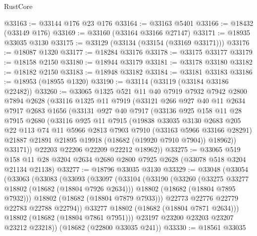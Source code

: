 \begin{lexlean}{RustCore}
\begin{coremodule}
@33163 := @33144 @176 @23 @176
@33164 := @33163 @5401
@33166 := @18432 (@33149 @176)
@33169 := @33160 (@33164 @33166 @27147)
@33171 := @18935 @33035 @3130
@33175 := @33129 (@33134 (@33154 (@33169 @33171)))
@33176 := @18087 @1320
@33177 := @18284 @33176
@33178 := @33175 @33177
@33179 := @18158 @2150
@33180 := @18944 @33179
@33181 := @33178 @33180
@33182 := @18182 @2150
@33183 := @18948 @33182
@33184 := @33181 @33183
@33186 := @18953 (@18955 @1320)
@33190 := @33114 (@33119 (@33184 @33186 @22482))
@33260 := @33065
    @1325
    @521
    @11
    @40
    @7919
    @7932
    @7942
    @2800
    @7894
    @2628
    (@33116
      @1325
      @11
      @7919
      (@33121
        @266
        @927
        @40
        @11
        @2634
        @7917
        @2683
        @1656
        (@33131
          @927
          @40
          @7917
          (@33136
            @925
            @158
            @11
            @28
            @7915
            @2680
            (@33116
              @925
              @11
              @7915
              (@19838
                @33035
                @3130
                @2683
                @205
                @22
                @113
                @74
                @11
                @5966
                @2813
                @7903
                @7910
                (@33163 @5966 @33166 @28291)
                @21887
                @21891
                @21895
                @19918
                (@18682 (@19920 @7910 @7904))
                @18962))
            @33171))
        @22203
        @22206
        @22209
        @22212
        @18962))
@33275 := @33065
    @519
    @158
    @11
    @28
    @3204
    @2634
    @2680
    @2800
    @7925
    @2628
    (@33078 @518 @3204 @21134 @21138)
@33277 := @18796 @33035 @3130
@33329 := @33048
    (@33054
      (@33063
        (@33083
          (@33093
            (@33097
              (@33104
                (@33190
                  (@33260
                    (@33275 @33277 @18802 (@18682 (@18804 @7926 @2634)))
                    @18802
                    (@18682 (@18804 @7895 @7932)))
                  @18802
                  (@18682 (@18804 @7879 @7933)))
                @22773
                @22776
                @22779
                @22783
                @22788
                @22794))
            @33277
            @18802
            (@18682 (@18804 @7871 @2634)))
          @18802
          (@18682 (@18804 @7861 @7951)))
        @23197
        @23200
        @23203
        @23207
        @23212
        @23218))
    (@18682 (@22800 @33035 @241))
@33330 := @18561 @33035

\end{coremodule}
\end{lexlean}
